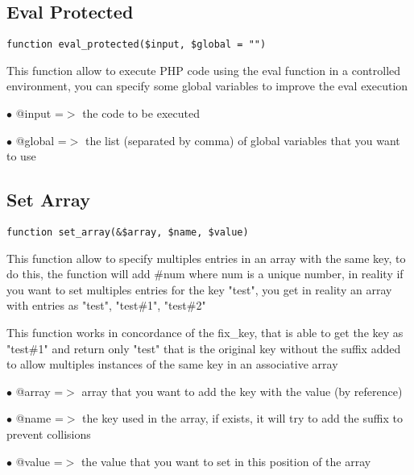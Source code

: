 \documentclass[a4paper]{book}
\begin{document}
\hypertarget{toc278}{}
\subsection{Eval Protected}

\begin{lstlisting}
function eval_protected($input, $global = "")
\end{lstlisting}

This function allow to execute PHP code using the eval function in a controlled
environment, you can specify some global variables to improve the eval execution

\begin{compactitem}
\item[\color{myblue}$\bullet$] @input  =$>$ the code to be executed
\item[\color{myblue}$\bullet$] @global =$>$ the list (separated by comma) of global variables that you want to use
\end{compactitem}

\hypertarget{toc279}{}
\subsection{Set Array}

\begin{lstlisting}
function set_array(&$array, $name, $value)
\end{lstlisting}

This function allow to specify multiples entries in an array with the same key,
to do this, the function will add \#num where num is a unique number, in reality
if you want to set multiples entries for the key "test", you get in reality an
array with entries as "test", "test\#1", "test\#2"

This function works in concordance of the fix\_key, that is able to get the key
as "test\#1" and return only "test" that is the original key without the suffix
added to allow multiples instances of the same key in an associative array

\begin{compactitem}
\item[\color{myblue}$\bullet$] @array =$>$ array that you want to add the key with the value (by reference)
\item[\color{myblue}$\bullet$] @name  =$>$ the key used in the array, if exists, it will try to add the suffix to
          prevent collisions
\item[\color{myblue}$\bullet$] @value =$>$ the value that you want to set in this position of the array
\end{compactitem}
\end{document}

